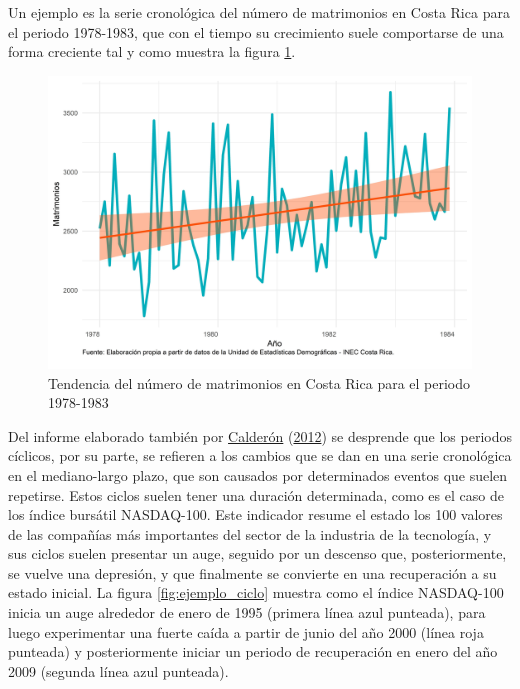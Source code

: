 \documentclass[
]{article}
\begin{document}
Un ejemplo es la serie cronológica del número de matrimonios en Costa
Rica para el periodo 1978-1983, que con el tiempo su crecimiento suele
comportarse de una forma creciente tal y como muestra la figura
\ref{fig:ejemplo_tendencia}.

\begin{figure}[H]
\includegraphics[width=1\linewidth,height=1\textheight]{Tesis_files/figure-latex/ejemplo_tendencia-1} \caption{Tendencia del número de matrimonios en Costa Rica para el periodo 1978-1983}\label{fig:ejemplo_tendencia}
\end{figure}

Del informe elaborado también por
\protect\hyperlink{ref-calderon2012estadistica}{Calderón}
(\protect\hyperlink{ref-calderon2012estadistica}{2012}) se desprende que
los periodos cíclicos, por su parte, se refieren a los cambios que se
dan en una serie cronológica en el mediano-largo plazo, que son causados
por determinados eventos que suelen repetirse. Estos ciclos suelen tener
una duración determinada, como es el caso de los índice bursátil
NASDAQ-100. Este indicador resume el estado los 100 valores de las
compañías más importantes del sector de la industria de la tecnología, y
sus ciclos suelen presentar un auge, seguido por un descenso que,
posteriormente, se vuelve una depresión, y que finalmente se convierte
en una recuperación a su estado inicial. La figura
\ref{fig:ejemplo_ciclo} muestra como el índice NASDAQ-100 inicia un auge
alrededor de enero de 1995 (primera línea azul punteada), para luego
experimentar una fuerte caída a partir de junio del año 2000 (línea roja
punteada) y posteriormente iniciar un periodo de recuperación en enero
del año 2009 (segunda línea azul punteada).
\end{document}
